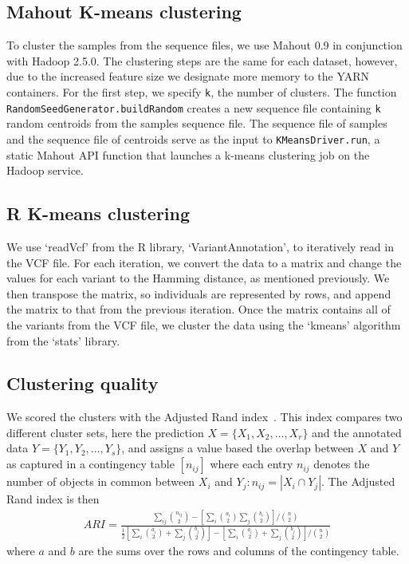 \documentclass{bioinfo}
\begin{document}
\begin{methods}
\subsection*{Mahout K-means clustering}
To cluster the samples from the sequence files, we use Mahout 0.9 in conjunction with Hadoop 2.5.0. 
The clustering steps are the same for each dataset, however, due to the increased feature size we designate more memory to the
YARN containers. For the first step, we specify \texttt{k},
the number of clusters. The function \texttt{RandomSeedGenerator.buildRandom} creates a new sequence file containing \texttt{k}
random centroids from the samples sequence file. The sequence file
of samples and the sequence file of centroids serve as the input to \texttt{KMeansDriver.run}, a static Mahout API function that launches
a k-means clustering job on the Hadoop service. 


\subsection*{R K-means clustering}
We use `readVcf' from the R library, `VariantAnnotation', to iteratively read in the VCF file. For each iteration, we convert the data to a matrix and
change the values for each variant to the Hamming distance, as mentioned previously. We then transpose the matrix, so individuals are represented
by rows, and append the matrix to that from the previous iteration. Once the matrix contains all of the variants from the VCF file, we cluster the data
using the `kmeans' algorithm from the `stats' library.



\subsection*{Clustering quality}
We scored the clusters with the Adjusted Rand index~\cite{Hubert1985}. 
This index compares two different cluster sets, here the prediction $X = \{ X_1, X_2, \ldots , X_r \}$ and the annotated data $Y = \{ Y_1, Y_2, \ldots , Y_s \}$, and assigns a value based the overlap between $X$ and $Y$ as captured in a contingency table $\left[n_{ij}\right]$ where each entry $n_{ij}$ denotes the number of objects in common between $X_i$ and $Y_j : n_{ij}=|X_i \cap Y_j|$. 
The Adjusted Rand index is then 
{\tiny
\begin{eqnarray*}
ARI=\frac{\sum_{ij}{{n_{ij}\choose 2}} - \left[ \sum_{i}{{a_i\choose2}} \sum_{j}{{b_i\choose2}} \right] / {n\choose2}}{\frac{1}{2} \left[ \sum_{i}{{a_{i}\choose 2} + \sum_{j}{{b_{j}\choose 2}}} \right] - \left[ \sum_{i}{{a_{i}\choose 2} + \sum_{j}{{b_{j}\choose 2}}} \right] / {n\choose2}} 
\end{eqnarray*}
}
where $a$ and $b$ are the sums over the rows and columns of the contingency table.


\end{methods}
\end{document}
